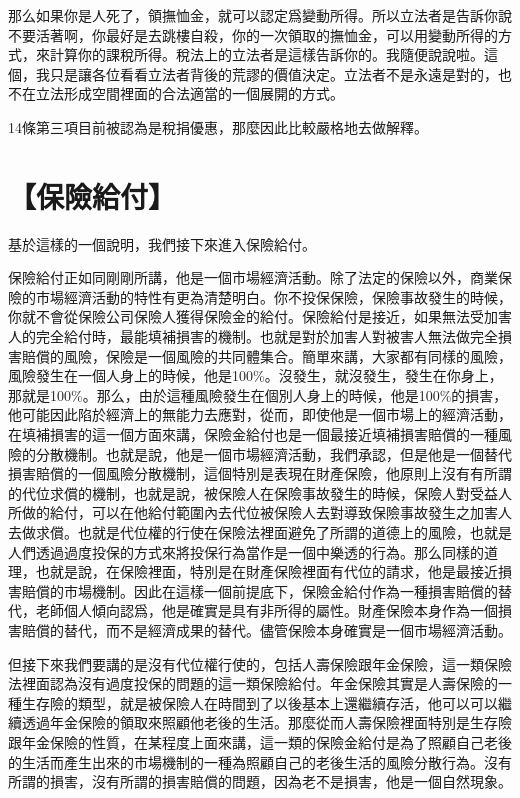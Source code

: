 \documentclass[]{ctexbook}
\begin{document}
那么如果你是人死了，領撫恤金，就可以認定爲變動所得。所以立法者是告訴你說不要活著啊，你最好是去跳樓自殺，你的一次領取的撫恤金，可以用變動所得的方式，來計算你的課稅所得。稅法上的立法者是這樣告訴你的。我隨便說說啦。這個，我只是讓各位看看立法者背後的荒謬的價值決定。立法者不是永遠是對的，也不在立法形成空間裡面的合法適當的一個展開的方式。

14條第三項目前被認為是稅捐優惠，那麼因此比較嚴格地去做解釋。

\hypertarget{ux4fddux96aaux7d66ux4ed8}{%
\section{【保險給付】}\label{ux4fddux96aaux7d66ux4ed8}}

基於這樣的一個說明，我們接下來進入保險給付。

保險給付正如同剛剛所講，他是一個市場經濟活動。除了法定的保險以外，商業保險的市場經濟活動的特性有更為清楚明白。你不投保保險，保險事故發生的時候，你就不會從保險公司保險人獲得保險金的給付。保險給付是接近，如果無法受加害人的完全給付時，最能填補損害的機制。也就是對於加害人對被害人無法做完全損害賠償的風險，保險是一個風險的共同體集合。簡單來講，大家都有同樣的風險，風險發生在一個人身上的時候，他是100\%。沒發生，就沒發生，發生在你身上，那就是100\%。那么，由於這種風險發生在個別人身上的時候，他是100\%的損害，他可能因此陷於經濟上的無能力去應對，從而，即使他是一個市場上的經濟活動，在填補損害的這一個方面來講，保險金給付也是一個最接近填補損害賠償的一種風險的分散機制。也就是說，他是一個市場經濟活動，我們承認，但是他是一個替代損害賠償的一個風險分散機制，這個特別是表現在財產保險，他原則上沒有有所謂的代位求償的機制，也就是說，被保險人在保險事故發生的時候，保險人對受益人所做的給付，可以在他給付範圍內去代位被保險人去對導致保險事故發生之加害人去做求償。也就是代位權的行使在保險法裡面避免了所謂的道德上的風險，也就是人們透過過度投保的方式來將投保行為當作是一個中樂透的行為。那么同樣的道理，也就是說，在保險裡面，特別是在財產保險裡面有代位的請求，他是最接近損害賠償的市場機制。因此在這樣一個前提底下，保險金給付作為一種損害賠償的替代，老師個人傾向認爲，他是確實是具有非所得的屬性。財產保險本身作為一個損害賠償的替代，而不是經濟成果的替代。儘管保險本身確實是一個市場經濟活動。

但接下來我們要講的是沒有代位權行使的，包括人壽保險跟年金保險，這一類保險法裡面認為沒有過度投保的問題的這一類保險給付。年金保險其實是人壽保險的一種生存險的類型，就是被保險人在時間到了以後基本上還繼續存活，他可以可以繼續透過年金保險的領取來照顧他老後的生活。那麼從而人壽保險裡面特別是生存險跟年金保險的性質，在某程度上面來講，這一類的保險金給付是為了照顧自己老後的生活而產生出來的市場機制的一種為照顧自己的老後生活的風險分散行為。沒有所謂的損害，沒有所謂的損害賠償的問題，因為老不是損害，他是一個自然現象。
\end{document}
